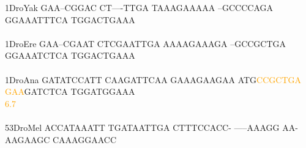 \documentclass[11pt,twoside,reqno,a4paper]{article}
\begin{document}
{1\hspace*{3\charwidth}DroYak	GAA--CGGAC	CT----TTGA	TAAAGAAAAA	--GCCCCAGA	GGAAATTTCA	TGGACTGAAA	\\
\hspace*{4\charwidth}\hspace*{7\charwidth}\hspace*{1\charwidth}\hspace*{1\charwidth}\hspace*{1\charwidth}\hspace*{1\charwidth}\hspace*{1\charwidth}\hspace*{1\charwidth}\\
1\hspace*{3\charwidth}DroEre	GAA--CGAAT	CTCGAATTGA	AAAAGAAAGA	--GCCGCTGA	GGAAATCTCA	TGGACTGAAA	\\
\hspace*{4\charwidth}\hspace*{7\charwidth}\hspace*{1\charwidth}\hspace*{1\charwidth}\hspace*{1\charwidth}\hspace*{1\charwidth}\hspace*{1\charwidth}\hspace*{1\charwidth}\\
1\hspace*{3\charwidth}DroAna	GATATCCATT	CAAGATTCAA	GAAAGAAGAA	ATG\textcolor{orange}{C}\textcolor{orange}{C}\textcolor{orange}{G}\textcolor{orange}{C}\textcolor{orange}{T}\textcolor{orange}{G}\textcolor{orange}{A}	\textcolor{orange}{G}\textcolor{orange}{A}\textcolor{orange}{A}GATCTCA	TGGATGGAAA	\\
\hspace*{4\charwidth}\hspace*{7\charwidth}\hspace*{1\charwidth}\hspace*{1\charwidth}\hspace*{1\charwidth}\hspace*{33\charwidth}\textcolor{orange}{6.7}\hspace*{1\charwidth}\hspace*{1\charwidth}\hspace*{1\charwidth}\\
\\
53\hspace*{2\charwidth}DroMel	ACCATAAATT	TGATAATTGA	CTTTCCACC-	-----AAAGG	AA-AAGAAGC	CAAAGGAACC	\\
}
\end{document}

